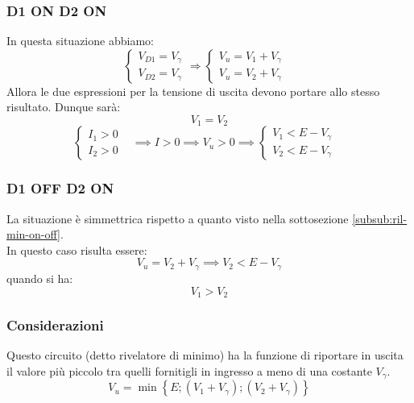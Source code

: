 \documentclass[../main.tex]{subfiles}
\begin{document}
	\subsubsection{D1 ON D2 ON}
	In questa situazione abbiamo:
	$$\begin{cases}V_{D1}=V_\gamma\\V_{D2}=V_\gamma\end{cases}\Longrightarrow\begin{cases}V_u=V_1+V_\gamma\\V_u=V_2+V_\gamma&\end{cases}$$
	Allora le due espressioni per la tensione di uscita devono portare allo stesso risultato. 
	Dunque sarà:
	$$V_1 = V_2$$
	$$\begin{cases}I_1>0\\I_2>0&\end{cases}\implies I>0\implies V_u>0\implies\begin{cases}V_1<E-V_\gamma\\V_2<E-V_\gamma&\end{cases}$$
	\subsubsection{D1 OFF D2 ON}
	La situazione è simmettrica rispetto a quanto visto nella sottosezione \ref{subsub:ril-min-on-off}.\\
	In questo caso risulta essere:
	$$V_u = V_2 + V_{\gamma} \implies V_2 < E - V_{\gamma}$$
	quando si ha:
	$$V_1 > V_2$$
	\subsubsection{Considerazioni}
	Questo circuito (detto rivelatore di minimo) ha la funzione di riportare in uscita il valore più piccolo tra quelli fornitigli in ingresso a meno di una costante $V_{\gamma}$.
	$$V_u = \min \left\{ E; (V_1 + V_{\gamma}); (V_2 + V_{\gamma}) \right\}$$
\end{document}
